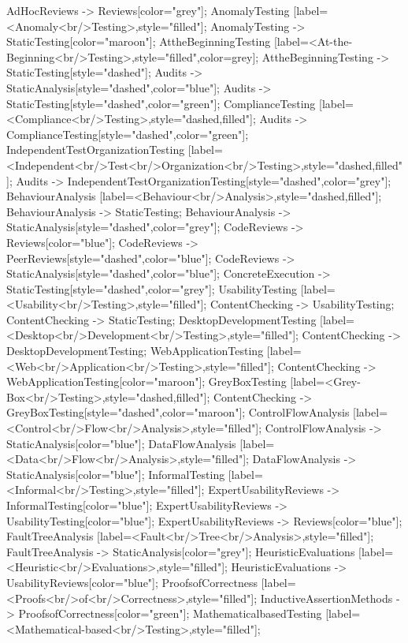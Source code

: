 \documentclass{article}
\begin{document}
{AdHocReviews -> Reviews[color="grey"];
AnomalyTesting [label=<Anomaly<br/>Testing>,style="filled"];
AnomalyTesting -> StaticTesting[color="maroon"];
AttheBeginningTesting [label=<At-the-Beginning<br/>Testing>,style="filled",color=grey];
AttheBeginningTesting -> StaticTesting[style="dashed"];
Audits -> StaticAnalysis[style="dashed",color="blue"];
Audits -> StaticTesting[style="dashed",color="green"];
ComplianceTesting [label=<Compliance<br/>Testing>,style="dashed,filled"];
Audits -> ComplianceTesting[style="dashed",color="green"];
IndependentTestOrganizationTesting [label=<Independent<br/>Test<br/>Organization<br/>Testing>,style="dashed,filled"];
Audits -> IndependentTestOrganizationTesting[style="dashed",color="grey"];
BehaviourAnalysis [label=<Behaviour<br/>Analysis>,style="dashed,filled"];
BehaviourAnalysis -> StaticTesting;
BehaviourAnalysis -> StaticAnalysis[style="dashed",color="grey"];
CodeReviews -> Reviews[color="blue"];
CodeReviews -> PeerReviews[style="dashed",color="blue"];
CodeReviews -> StaticAnalysis[style="dashed",color="blue"];
ConcreteExecution -> StaticTesting[style="dashed",color="grey"];
UsabilityTesting [label=<Usability<br/>Testing>,style="filled"];
ContentChecking -> UsabilityTesting;
ContentChecking -> StaticTesting;
DesktopDevelopmentTesting [label=<Desktop<br/>Development<br/>Testing>,style="filled"];
ContentChecking -> DesktopDevelopmentTesting;
WebApplicationTesting [label=<Web<br/>Application<br/>Testing>,style="filled"];
ContentChecking -> WebApplicationTesting[color="maroon"];
GreyBoxTesting [label=<Grey-Box<br/>Testing>,style="dashed,filled"];
ContentChecking -> GreyBoxTesting[style="dashed",color="maroon"];
ControlFlowAnalysis [label=<Control<br/>Flow<br/>Analysis>,style="filled"];
ControlFlowAnalysis -> StaticAnalysis[color="blue"];
DataFlowAnalysis [label=<Data<br/>Flow<br/>Analysis>,style="filled"];
DataFlowAnalysis -> StaticAnalysis[color="blue"];
InformalTesting [label=<Informal<br/>Testing>,style="filled"];
ExpertUsabilityReviews -> InformalTesting[color="blue"];
ExpertUsabilityReviews -> UsabilityTesting[color="blue"];
ExpertUsabilityReviews -> Reviews[color="blue"];
FaultTreeAnalysis [label=<Fault<br/>Tree<br/>Analysis>,style="filled"];
FaultTreeAnalysis -> StaticAnalysis[color="grey"];
HeuristicEvaluations [label=<Heuristic<br/>Evaluations>,style="filled"];
HeuristicEvaluations -> UsabilityReviews[color="blue"];
ProofsofCorrectness [label=<Proofs<br/>of<br/>Correctness>,style="filled"];
InductiveAssertionMethods -> ProofsofCorrectness[color="green"];
MathematicalbasedTesting [label=<Mathematical-based<br/>Testing>,style="filled"];
}
\end{document}
